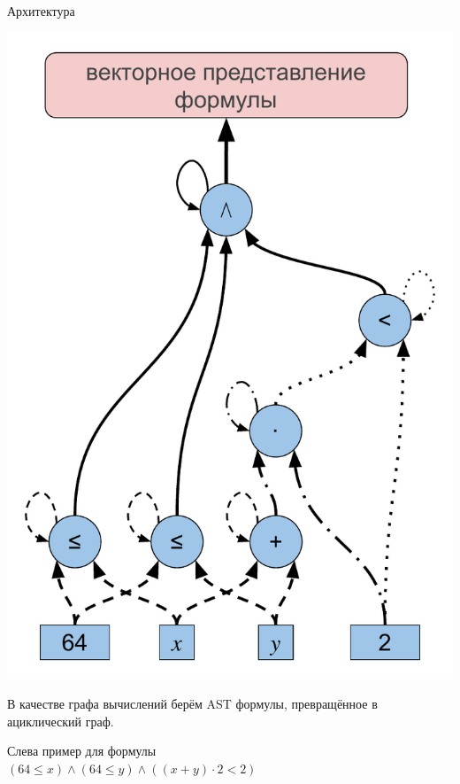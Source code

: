 \documentclass[14pt,aspectratio=169,hyperref={pdftex,unicode},xcolor=dvipsnames]{beamer}
\renewcommand{\le}{\leqslant}
\begin{document}
\begin{frame}{Архитектура}

\begin{minipage}{0.5\textwidth}

\begin{center}
  \includegraphics[scale=0.37]{./assets/formula-ast-talk.pdf}
\end{center}

\end{minipage}%
\begin{minipage}{0.5\textwidth}

В качестве графа вычислений берём AST формулы, превращённое в ациклический граф.

\medskip

Слева пример для формулы \\ {\small $(64 \le x) \wedge (64 \le y) \wedge ((x + y) \cdot 2 < 2)$}

\end{minipage}

\end{frame}
\end{document}
